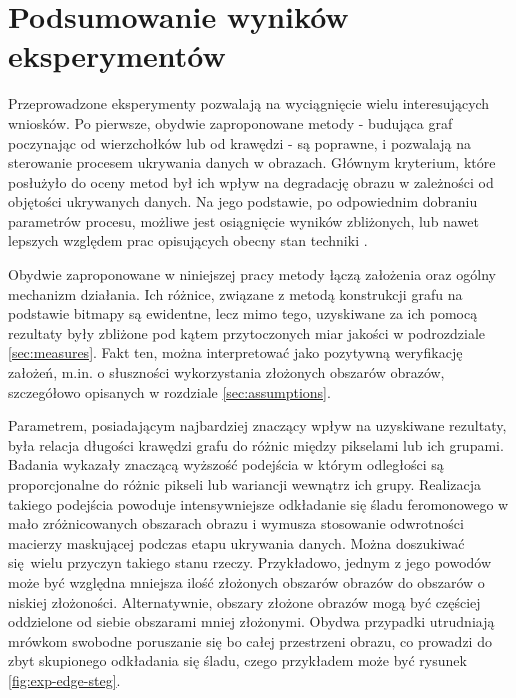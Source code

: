 {    \section{Podsumowanie wyników eksperymentów}
    {
        Przeprowadzone eksperymenty pozwalają na wyciągnięcie wielu interesujących wniosków. Po pierwsze, obydwie
        zaproponowane metody - budująca graf poczynając od wierzchołków lub od krawędzi - są poprawne, i pozwalają na
        sterowanie procesem ukrywania danych w obrazach. Głównym kryterium, które posłużyło do oceny metod był ich wpływ
        na degradację obrazu w zależności od objętości ukrywanych danych. Na jego podstawie, po odpowiednim dobraniu
        parametrów procesu, możliwe jest osiągnięcie wyników zbliżonych, lub nawet lepszych względem prac opisujących
        obecny stan techniki \cite{Solak2018LSBSA, Muhuri2020ANI, Khan2018AntCO}.

        Obydwie zaproponowane w niniejszej pracy metody łączą założenia oraz ogólny mechanizm działania. Ich różnice,
        związane z metodą konstrukcji grafu na podstawie bitmapy są ewidentne, lecz mimo tego, uzyskiwane za ich pomocą
        rezultaty były zbliżone pod kątem przytoczonych miar jakości w podrozdziale \ref{sec:measures}. Fakt ten, można
        interpretować jako pozytywną weryfikację założeń, m.in. o słuszności wykorzystania złożonych obszarów obrazów,
        szczegółowo opisanych w rozdziale \ref{sec:assumptions}.

        Parametrem, posiadającym najbardziej znaczący wpływ na uzyskiwane rezultaty, była relacja długości krawędzi
        grafu do różnic między pikselami lub ich grupami. Badania wykazały znaczącą wyższość podejścia w którym
        odległości są proporcjonalne do różnic pikseli lub wariancji wewnątrz ich grupy. Realizacja takiego podejścia
        powoduje intensywniejsze odkładanie się śladu feromonowego w mało zróżnicowanych obszarach obrazu i wymusza
        stosowanie odwrotności macierzy maskującej podczas etapu ukrywania danych. Można doszukiwać się wielu przyczyn
        takiego stanu rzeczy. Przykładowo, jednym z jego powodów może być względna mniejsza ilość złożonych obszarów
        obrazów do obszarów o niskiej złożoności. Alternatywnie, obszary złożone obrazów mogą być częściej oddzielone od
        siebie obszarami mniej złożonymi. Obydwa przypadki utrudniają mrówkom swobodne poruszanie się bo całej
        przestrzeni obrazu, co prowadzi do zbyt skupionego odkładania się śladu, czego przykładem może być rysunek
        \ref{fig:exp-edge-steg}.

}}
